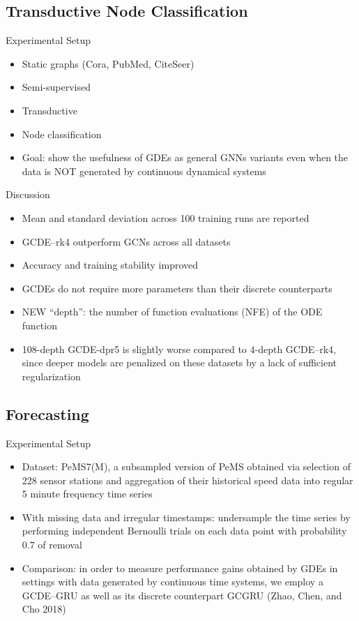 \documentclass{beamer}
\begin{document}
\subsection{Transductive Node Classification}
\begin{frame}{Experimental Setup}
\begin{itemize}
\item Static graphs (Cora, PubMed, CiteSeer)
\item Semi-supervised
\item Transductive
\item Node classification
\item Goal: show the usefulness of GDEs as general GNNs variants even when the data is NOT generated by continuous dynamical systems
\end{itemize}
\end{frame}
\begin{frame}{Discussion}
\begin{itemize}
\item Mean and standard deviation across 100 training runs are reported
\item GCDE–rk4 outperform GCNs across all datasets
\item Accuracy and training stability improved
\item GCDEs do not require more parameters than their discrete counterparts
\item NEW ``depth'': the number of function evaluations (NFE) of the ODE function
\item 108-depth GCDE-dpr5 is slightly worse compared to 4-depth GCDE–rk4, since deeper models are penalized on these datasets by a lack of sufficient regularization
\end{itemize}
\end{frame}

\subsection{Forecasting}
\begin{frame}{Experimental Setup}
\begin{itemize}
\item Dataset: PeMS7(M), a subsampled version of PeMS obtained via selection of 228 sensor stations and aggregation of their historical speed data into regular 5 minute frequency time series
\item With missing data and irregular timestamps:  undersample the time series by performing independent Bernoulli trials on each data point with probability $0.7$ of removal
\item Comparison: in order to measure performance gains obtained by GDEs in settings with data generated by continuous time systems, we employ a GCDE–GRU as well as its discrete counterpart GCGRU (Zhao, Chen, and Cho 2018)
\end{itemize}
\end{frame}
\end{document}
